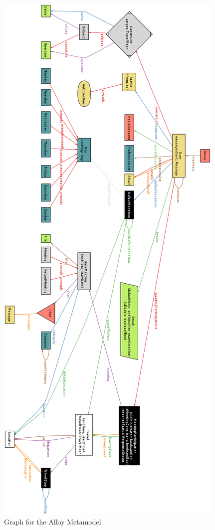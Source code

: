 \begin{figure}
	\vspace*{-0.5cm}
	\centering\includegraphics[height=\textheight]{Images/AlloyMetamodel.png}
	\caption{Graph for the Alloy Metamodel}
\end{figure}

